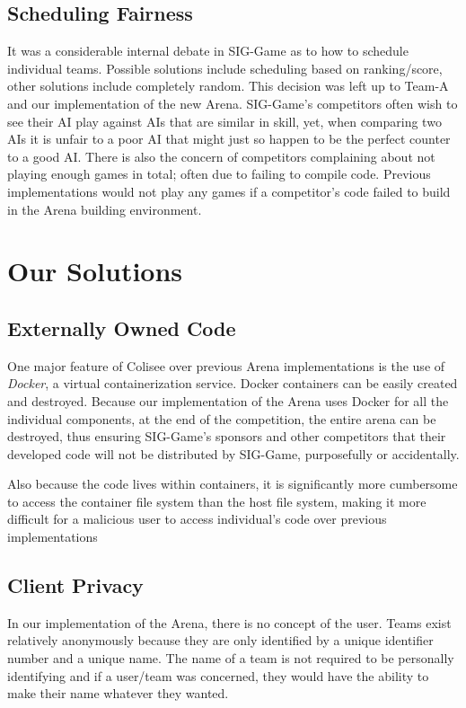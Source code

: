 \documentclass{article}
\begin{document}
\subsection{Scheduling Fairness}
It was a considerable internal debate in SIG-Game as to how to schedule individual teams. Possible solutions include scheduling based on ranking/score, other solutions include completely random. This decision was left up to Team-A and our implementation of the new Arena. SIG-Game's competitors often wish to see their AI play against AIs that are similar in skill, yet, when comparing two AIs it is unfair to a poor AI that might just so happen to be the perfect counter to a good AI.
There is also the concern of competitors complaining about not playing enough games in total; often due to failing to compile code. Previous implementations would not play any games if a competitor's code failed to build in the Arena building environment.

\newpage
\section{Our Solutions}
\subsection{Externally Owned Code}
One major feature of Colisee over previous Arena implementations is the use of \textit{Docker}, a virtual containerization service. Docker containers can be easily created and destroyed. Because our implementation of the Arena uses Docker for all the individual components, at the end of the competition, the entire arena can be destroyed, thus ensuring SIG-Game's sponsors and other competitors that their developed code will not be distributed by SIG-Game, purposefully or accidentally.

Also because the code lives within containers, it is significantly more cumbersome to access the container file system than the host file system, making it more difficult for a malicious user to access individual's code over previous implementations

\subsection{Client Privacy}
In our implementation of the Arena, there is no concept of the user. Teams exist relatively anonymously because they are only identified by a unique identifier number and a unique name. The name of a team is not required to be personally identifying and if a user/team was concerned, they would have the ability to make their name whatever they wanted.
\end{document}
